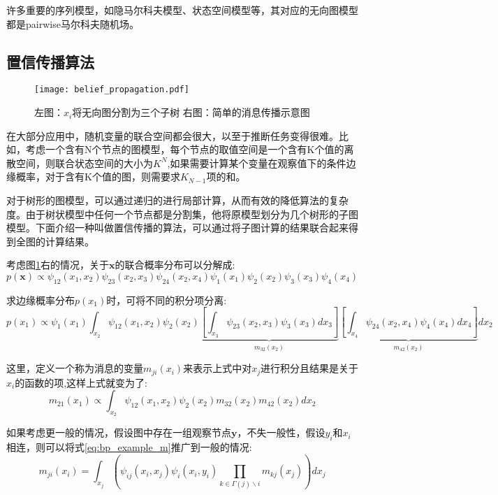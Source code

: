 许多重要的序列模型，如隐马尔科夫模型、状态空间模型等，其对应的无向图模型都是pairwise马尔科夫随机场。

\subsection{置信传播算法}
\begin{figure}
\texttt{[image: belief\_propagation.pdf]} 

  \caption{左图：$x_i$将无向图分割为三个子树  右图：简单的消息传播示意图}\label{fig:belief_propagation}
\end{figure}
在大部分应用中，随机变量的联合空间都会很大，以至于推断任务变得很难。比如，考虑一个含有N个节点的图模型，每个节点的取值空间是一个含有K个值的离散空间，则联合状态空间的大小为$K^N$,如果需要计算某个变量在观察值下的条件边缘概率，对于含有K个值的图，则需要求$K_{N-1}$项的和。

对于树形的图模型，可以通过递归的进行局部计算，从而有效的降低算法的复杂度。由于树状模型中任何一个节点都是分割集，他将原模型划分为几个树形的子图模型。下面介绍一种叫做置信传播的算法\cite{Shafer:90}，可以通过将子图计算的结果联合起来得到全图的计算结果。


考虑图\ref{fig:belief_propagation}右的情况，关于${\bm x}$的联合概率分布可以分解成:
\begin{equation}
p({\bm x}) \propto \psi_{12}(x_1,x_2)\psi_{23}(x_2,x_3)\psi_{24}(x_2,x_4)\psi_{1}(x_1)\psi_{2}(x_2)\psi_{3}(x_3)\psi_{4}(x_4)
\end{equation}

求边缘概率分布$p(x_1)$时，可将不同的积分项分离:
\begin{equation}
p(x_1) \propto \psi_{1}(x_1) \int_{x_2}{\psi_{12}(x_1,x_2)\psi_{2}(x_2) \underbrace{\left[ \int_{x_3}\psi_{23}(x_2,x_3) \psi_{3}(x_3)d {x_3} \right]}_{m_{32}(x_2)}  \underbrace{\left[ \int_{x_4}{\psi_{24}(x_2,x_4)\psi_{4}(x_4)} d {x_4} \right]}_{m_{42}(x_2)} } d {x_2} \label{eq:bp_example_raw}
\end{equation}

这里，定义一个称为{消息}的变量${m_{ji}(x_i)}$来表示上式中对$x_j$进行积分且结果是关于$x_i$的函数的项,这样上式就变为了:
\begin{equation}
{m_{21}(x_1)} \propto \int_{x_2}{\psi_{12}(x_1,x_2)\psi_{2}(x_2) {m_{32}(x_2)} {m_{42}(x_2)} } d {x_2} \label{eq:bp_example_m}
\end{equation}

如果考虑更一般的情况，假设图中存在一组观察节点${\bm y}$，不失一般性，假设$y_i$和$x_i$相连，则可以将式\eqref{eq:bp_example_m}推广到一般的情况:
\begin{equation}
{m_{ji}(x_i)} = \int_{x_j}\left({\psi_{ij}(x_i,x_j)\psi_{i}(x_i,y_i) \prod_{k \in \Gamma(j)\backslash i}{m_{kj}(x_j)} }\right) d {x_j} \label{eq:massage_passing_general}
\end{equation}

